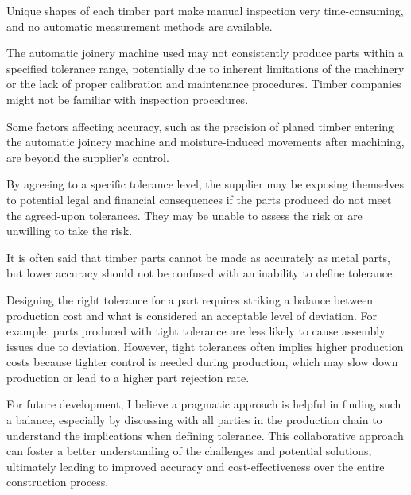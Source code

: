 \begin{description}[style=unboxed] %

	\item [Economic considerations] Unique shapes of each timber part make manual inspection very time-consuming, and no automatic measurement methods are available.

	\item [Limited capabilities] The automatic joinery machine used may not consistently produce parts within a specified tolerance range, potentially due to inherent limitations of the machinery or the lack of proper calibration and maintenance procedures. Timber companies might not be familiar with inspection procedures.

	\item [Industry norms] Some factors affecting accuracy, such as the precision of planed timber entering the automatic joinery machine and moisture-induced movements after machining, are beyond the supplier's control.

	\item [Liability concerns] By agreeing to a specific tolerance level, the supplier may be exposing themselves to potential legal and financial consequences if the parts produced do not meet the agreed-upon tolerances. They may be unable to assess the risk or are unwilling to take the risk.

\end{description}
It is often said that timber parts cannot be made as accurately as metal parts, but lower accuracy should not be confused with an inability to define tolerance. 

Designing the right tolerance for a part requires striking a balance between production cost and what is considered an acceptable level of deviation. For example, parts produced with tight tolerance are less likely to cause assembly issues due to deviation. However, tight tolerances often implies higher production costs because tighter control is needed during production, which may slow down production or lead to a higher part rejection rate.

For future development, I believe a pragmatic approach is helpful in finding such a balance, especially by discussing with all parties in the production chain to understand the implications when defining tolerance. This collaborative approach can foster a better understanding of the challenges and potential solutions, ultimately leading to improved accuracy and cost-effectiveness over the entire construction process.

